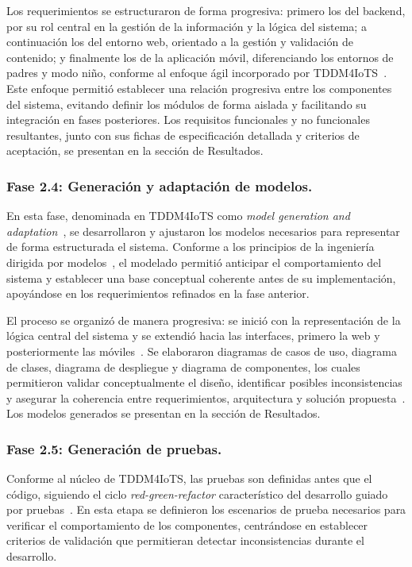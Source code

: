 					Los requerimientos se estructuraron de forma progresiva: primero los del backend, por su rol central en la gestión de la información y la lógica del sistema; a continuación los del entorno web, orientado a la gestión y validación de contenido; y finalmente los de la aplicación móvil, diferenciando los entornos de padres y modo niño, conforme al enfoque ágil incorporado por TDDM4IoTS~\cite{GuerreroUlloa2024}. Este enfoque permitió establecer una relación progresiva entre los componentes del sistema, evitando definir los módulos de forma aislada y facilitando su integración en fases posteriores. Los requisitos funcionales y no funcionales resultantes, junto con sus fichas de especificación detallada y criterios de aceptación, se presentan en la sección de Resultados.
					
				\subsubsection{Fase 2.4: Generación y adaptación de modelos.}
					En esta fase, denominada en TDDM4IoTS como \textit{model generation and adaptation}~\cite{GuerreroUlloa2024}, se desarrollaron y ajustaron los modelos necesarios para representar de forma estructurada el sistema. Conforme a los principios de la ingeniería dirigida por modelos~\cite{Kleppmann2017}, el modelado permitió anticipar el comportamiento del sistema y establecer una base conceptual coherente antes de su implementación, apoyándose en los requerimientos refinados en la fase anterior.
					
					El proceso se organizó de manera progresiva: se inició con la representación de la lógica central del sistema y se extendió hacia las interfaces, primero la web y posteriormente las móviles~\cite{GuerreroUlloa2024}. Se elaboraron diagramas de casos de uso, diagrama de clases, diagrama de despliegue y diagrama de componentes, los cuales permitieron validar conceptualmente el diseño, identificar posibles inconsistencias y asegurar la coherencia entre requerimientos, arquitectura y solución propuesta~\cite{Fowler2002}. Los modelos generados se presentan en la sección de Resultados.
					
				\subsubsection{Fase 2.5: Generación de pruebas.}
					Conforme al núcleo de TDDM4IoTS, las pruebas son definidas antes que el código, siguiendo el ciclo \textit{red-green-refactor} característico del desarrollo guiado por pruebas~\cite{Fowler2002,GuerreroUlloa2024}. En esta etapa se definieron los escenarios de prueba necesarios para verificar el comportamiento de los componentes, centrándose en establecer criterios de validación que permitieran detectar inconsistencias durante el desarrollo.
					
